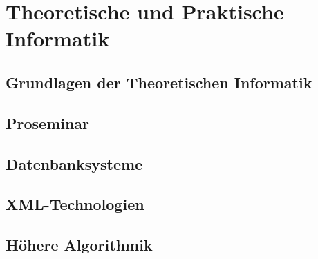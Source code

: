 \part{Theoretische und Praktische Informatik}
\chapter{Grundlagen der Theoretischen Informatik}

\chapter{Proseminar}
\chapter{Datenbanksysteme}

\chapter{XML-Technologien}

\chapter{Höhere Algorithmik}


